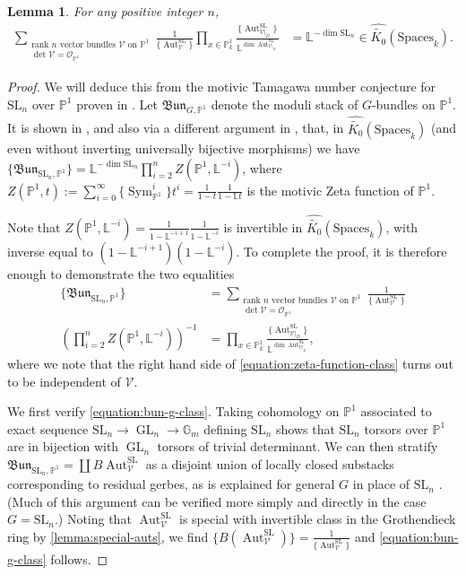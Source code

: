 \documentclass[12 pt]{amsart}
\newcommand{\rboxed}[1]{#1}
\theoremstyle{plain}
\newtheorem{lemma}[theorem]{Lemma}
\theoremstyle{definition}
\theoremstyle{remark}
\numberwithin{equation}{section}
\newcommand\bg{\mathbb G}
\newcommand\bl{\mathbb L}
\newcommand\bp{\mathbb P}
\newcommand\sco{\mathscr O}
\newcommand\scv{\mathscr V}
\newcommand\grcSpaces{\widehat{\widetilde{K_0}}(\mathrm{Spaces}_k)} %
\DeclareMathOperator\sym{Sym}
\DeclareMathOperator\aut{Aut}
\DeclareMathOperator\gl{GL}
\renewcommand\sl{\mathrm{SL}}
\begin{document}
\begin{lemma} \label{lemma:sl-tamagawa} For any positive integer $n$,
	\begin{align*} \sum_{\substack{\text{rank $n$ vector bundles $\scv$ on
		$\bp^1$} \\ \det \scv = \sco_{\bp^1}}}
		\frac{1}{\{\aut^{\sl}_{\scv}\}}  \prod_{x \in
		\bp^1_k}\frac{\{\aut^{\sl}_{\scv|_D}\}}{\bl^{\dim
		\aut^{\sl}_{\scv|_D}}} &= \bl^{-\dim \sl_n} \in
		\grcSpaces.  \end{align*} \end{lemma} 
\begin{proof} We will
		deduce this from the motivic Tamagawa number conjecture
		for $\sl_n$ over $\bp^1$ proven in
		\cite[\S7]{behrendD:on-the-motivic-class-of-the-stack-of-bundles}.
Let $\rboxed{\mathfrak{Bun}_{G,\bp^1}}$  denote the moduli stack of $G$-bundles
on $\bp^1$.  It is shown in
\cite[\S7]{behrendD:on-the-motivic-class-of-the-stack-of-bundles}, and also via
a different argument in
\cite[\S6]{behrendD:on-the-motivic-class-of-the-stack-of-bundles}, that, in
$\grcSpaces$ (and even without inverting universally bijective morphisms) we have
$\{\mathfrak{Bun}_{\sl_n,\bp^1}\} = \bl^{-\dim \sl_n} \prod_{i=2}^n Z(\bp^1,
\bl^{-i})$, where $\rboxed{Z(\bp^1, t)} := \sum_{i=0}^\infty \{\sym^i_{\bp^1}\} t^i = \frac{1}{1-t}\frac{1}{1-\bl t}$ is the motivic Zeta
function of $\bp^1$. 

Note that $Z(\bp^1, \bl^{-i}) =
\frac{1}{1-\bl^{-i+1}}\frac{1}{1-\bl^{-i}}$ is invertible in $\grcSpaces$, with
inverse equal to $(1-\bl^{-i+1})(1-\bl^{-i})$. 
To complete the proof, it is therefore enough to demonstrate the two
equalities \begin{align} \label{equation:bun-g-class}
	\{\mathfrak{Bun}_{\sl_n,\bp^1}\} &= \sum_{\substack{\text{rank $n$ vector
	bundles $\scv$ on $\bp^1$} \\ \det \scv = \sco_{\bp^1} }}
	\frac{1}{\{\aut^{\sl}_{\scv}\}} \\ \label{equation:zeta-function-class}
\left(\prod_{i=2}^n Z(\bp^1, \bl^{-i})\right)^{-1} &= \prod_{x \in
\bp^1_k}\frac{\{\aut^{\sl}_{\scv|_D}\}}{\bl^{\dim \aut^{\sl}_{\scv|_D}}},
\end{align} 
where we note that the right hand side of \eqref{equation:zeta-function-class}
turns out to be independent of $\scv$.

We first verify \eqref{equation:bun-g-class}.  Taking cohomology on
$\bp^1$ associated to exact sequence $\sl_n \to \gl_n \to \bg_m$ defining
$\sl_n$ shows that $\sl_n$ torsors over $\bp^1$ are in bijection with $\gl_n$
torsors of trivial determinant.  We can then stratify
$\mathfrak{Bun}_{\sl_n,\bp^1} = \coprod B \aut^{\sl}_{\scv}$ as a disjoint
union of locally closed substacks corresponding to residual gerbes, as is explained for general $G$ in place of
$\sl_n$ \cite[p. 636]{behrendD:on-the-motivic-class-of-the-stack-of-bundles}. 
(Much of this argument can be verified more simply and directly in the case $G = \sl_n$.)
Noting that $\aut^{\sl}_\scv$ is special with invertible class in the
Grothendieck ring by \autoref{lemma:special-auts}, we find
$\{B(\aut^{\sl}_{\scv})\} = \frac{1}{\{\aut^{\sl}_{\scv}\}}$ and
	\eqref{equation:bun-g-class} follows.


\end{proof}
\end{document}
